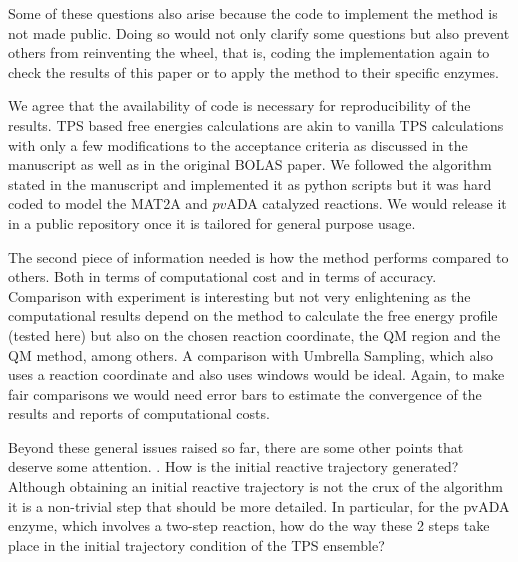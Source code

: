 \documentclass[journal=jpcbfk,manuscript=article,layout=traditional]{achemso}
\begin{document}
{\begin{response}
\end{response}

\begin{response}{Some of these questions also arise because the 
code to implement the method is not made public. Doing so would 
not only clarify some questions but also prevent others from 
reinventing the wheel, that is, coding the implementation again 
to check the results of this paper or to apply the method to their specific enzymes.}

We agree that the availability of code is necessary for reproducibility of the results.
TPS based free energies calculations are akin to vanilla TPS calculations with 
only a few modifications to the acceptance criteria as discussed in the manuscript as well
as in the original BOLAS paper. We followed the algorithm stated in the manuscript
and implemented it as python scripts but it was hard coded to model the MAT2A and 
$\textit{pv}$ADA catalyzed reactions. We would release it in a public repository once it is 
tailored for general purpose usage.  
\end{response}

\begin{response}{The second piece of information needed is how the method 
performs compared to others. Both in terms of computational cost and in 
terms of accuracy. Comparison with experiment is interesting but not very 
enlightening as the computational results depend on the method to calculate 
the free energy profile (tested here) but also on the chosen reaction coordinate, 
the QM region and the QM method, among others. A comparison with Umbrella Sampling, 
which also uses a reaction coordinate and also uses windows would be ideal. Again, 
to make fair comparisons we would need error bars to estimate the convergence of 
the results and reports of computational costs.}


\end{response}

\begin{response}{Beyond these general issues raised so far, there are some other points 
that deserve some attention.
. How is the initial reactive trajectory generated? Although obtaining an initial reactive 
trajectory is not the crux of the algorithm it is a non-trivial step that should be more 
detailed. In particular, for the pvADA enzyme, which involves a two-step reaction, how 
do the way these 2 steps take place in the initial trajectory condition of the TPS ensemble?}


\end{response}}
\end{document}
